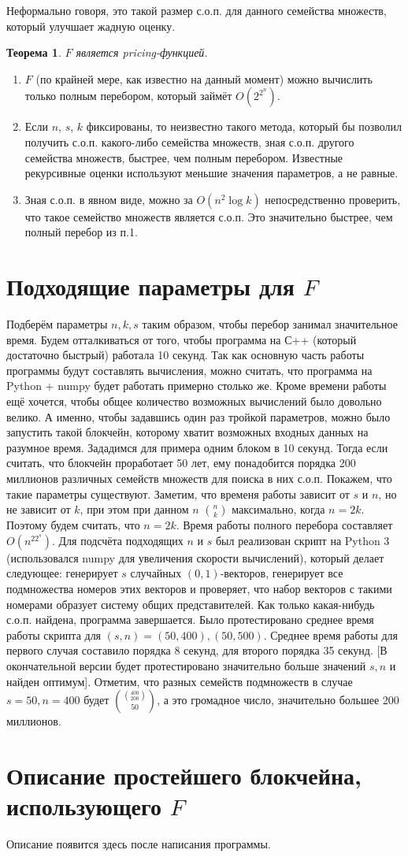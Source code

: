\documentclass{article}
\newtheorem*{theorem}{Теорема}
\begin{document}
    Неформально говоря, это такой размер с.о.п. для данного семейства множеств, который улучшает жадную оценку.


\begin{theorem}
    $F$ является pricing-функцией. 
\end{theorem}

\begin{enumerate}
\item $F$ (по крайней мере, как известно на данный момент) можно вычислить только полным перебором, который займёт $O(2^{2^n})$. 
\item Если $n$, $s$, $k$ фиксированы, то неизвестно такого метода, который бы позволил получить с.о.п. какого-либо семейства множеств, зная с.о.п. другого семейства множеств, быстрее, чем полным перебором. Известные рекурсивные оценки используют меньшие значения параметров, а не равные.
\item Зная с.о.п. в явном виде, можно за $O(n^2 \log k)$ непосредственно проверить, что такое семейство множеств является с.о.п. Это значительно быстрее, чем полный перебор из п.1.
\end{enumerate}

\section{Подходящие параметры для $F$}

    Подберём параметры $n, k, s$ таким образом, чтобы перебор занимал значительное время. Будем отталкиваться от того, чтобы программа на С++ (который достаточно быстрый) работала 10 секунд. Так как основную часть работы программы будут составлять вычисления, можно считать, что программа на Python + numpy будет работать примерно столько же.
    Кроме времени работы ещё хочется, чтобы общее количество возможных вычислений было довольно велико. А именно, чтобы задавшись один раз тройкой параметров, можно было запустить такой блокчейн, которому хватит возможных входных данных на разумное время. Зададимся для примера одним блоком в 10 секунд. Тогда если считать, что блокчейн проработает 50 лет, ему понадобится порядка 200 миллионов различных семейств множеств для поиска в них с.о.п.
    Покажем, что такие параметры существуют. Заметим, что временя работы зависит от $s$ и $n$, но не зависит от $k$, при этом при данном $n$ $n \choose k$ максимально, когда $n = 2k$. Поэтому будем считать, что $n = 2k$. Время работы полного перебора составляет $O(n^22^s)$.
    Для подсчёта подходящих $n$ и $s$ был реализован скрипт на Python 3 (использовался numpy для увеличения скорости вычислений), который делает следующее: генерирует $s$ случайных $(0, 1)$-векторов, генерирует все подмножества номеров этих векторов и проверяет, что набор векторов с такими номерами образует систему общих представителей. Как только какая-нибудь с.о.п. найдена, программа завершается. 
    Было протестировано среднее время работы скрипта для $(s, n) = (50, 400), (50, 500)$. Среднее время работы для первого случая составило порядка 8 секунд, для второго порядка 35 секунд. [В окончательной версии будет протестировано значительно больше значений $s, n$ и найден оптимум].
    Отметим, что разных семейств подмножеств в случае $s = 50, n = 400$ будет ${400 \choose 200} \choose {50} $, а это громадное число, значительно большее 200 миллионов.
\section{Описание простейшего блокчейна, использующего $F$}

Описание появится здесь после написания программы.
\end{document}
